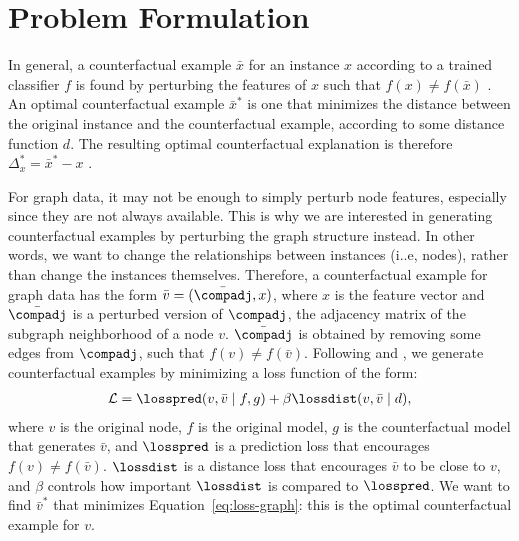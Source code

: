 
\section{Problem Formulation}
\label{section:problem-formulation}
In general, a counterfactual example $\bar{x}$ for an instance $x$ according to a trained classifier $f$ is found by perturbing the features of $x$ such that $f(x) \neq f(\bar{x})$ \citep{wachter_counterfactual_2017}. 
An optimal counterfactual example $\bar{x}^*$ is one that minimizes the distance between the original instance and the counterfactual example, according to some distance function $d$. 
The resulting optimal counterfactual explanation is therefore $\Delta^*_{x} = \bar{x}^* - x$ \citep{lucic2020focus}. 

For graph data, it may not be enough to simply perturb node features, especially since they are not always available. 
This is why we are interested in generating counterfactual examples by perturbing the graph structure instead. 
In other words, we want to change the relationships between instances (i..e, nodes), rather than change the instances themselves. 
Therefore, a counterfactual example for graph data has the form $\bar{v} = (\bar{\compadj}, x)$, where $x$ is the feature vector and $\bar{\compadj}$ is a perturbed version of  $\compadj$, the adjacency matrix of the subgraph neighborhood of a node $v$. $\bar{\compadj}$ is obtained by removing some edges from $\compadj$, such that $f(v) \neq f(\bar{v})$. 
Following \citet{wachter_counterfactual_2017} and \citet{lucic2020focus}, we generate counterfactual examples by minimizing a loss function of the form:
\begin{align}
\label{eq:loss-graph}
    \mathcal{L} = \losspred(v, \bar{v} \mid f, g) + \beta \lossdist(v, \bar{v} \mid d),
\end{align}
where $v$ is the original node, $f$ is the original model, $g$ is the counterfactual model that generates $\bar{v}$, and $\losspred$ is a prediction loss that encourages $f(v) \neq f(\bar{v})$. 
$\lossdist$ is a distance loss that encourages $\bar{v}$ to be close to $v$, and $\beta$ controls how important $\lossdist$ is compared to $\losspred$. 
We want to find $\bar{v}^*$ that minimizes Equation~\ref{eq:loss-graph}: this is the optimal counterfactual example for $v$. 











